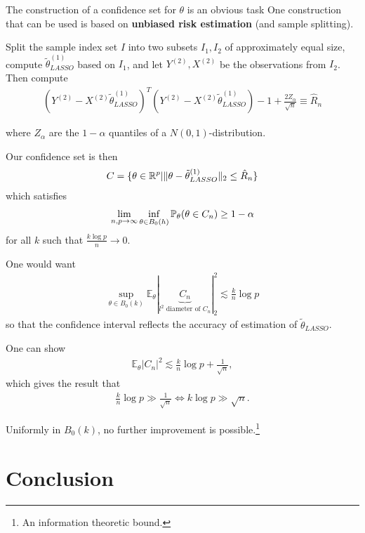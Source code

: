 The construction of a confidence set for $\theta$ is an obvious task
One construction that can be used is based on \textbf{unbiased risk
  estimation} (and sample splitting).

Split the sample index set $I$ into two subsets $I_{1}, I_{2}$ of
approximately equal size, compute $\tilde \theta^{(1)}_{LASSO}$ based
on $I_{1}$, and let $Y^{(2)}, X^{(2)}$ be the observations from
$I_{2}$. Then compute
\begin{align}
  \label{eq:186}
  (Y^{(2)} - X^{(2)} \tilde \theta^{(1)}_{LASSO})^{T} (Y^{(2)} -
  X^{(2)} \tilde \theta^{(1)}_{LASSO}) - 1 + \frac{2 Z_{\alpha}}{\sqrt{n}} \equiv \hat R_{n}
\end{align}


where $Z_{\alpha}$ are the $1-\alpha$ quantiles of a $N(0,
1)$-distribution.

Our confidence set is then
\begin{align}
  \label{eq:187}
  C = \{ \theta \in \mathbb{R}^{p} | \| \theta - \tilde \theta_{LASSO}^{(1)}
  \|_{2} \leq \hat R_{n} \}
\end{align} which satisfies
\begin{align}
  \label{eq:188}
  \lim_{n, p \rightarrow \infty} \inf_{\theta \in B_{0}(h)}
  \Prob_{\theta}(\theta \in C_{n}) \geq 1 - \alpha
\end{align} for all $k$ such that $\frac{k \log p}{n} \rightarrow 0$.

One would want
\begin{align}
  \label{eq:189}
  \sup_{\theta \in B_{0}(k)} \mathbb{E}_{\theta}
  |\underbrace{C_{n}}_{\text{$l^{2}$ diameter of $C_{n}$}}|_{2}^{2}
  \lesssim \frac{k}{n} \log p
\end{align} so that the confidence interval reflects the accuracy of
estimation of $\tilde \theta_{LASSO}$.

One can show
\begin{align}
  \label{eq:190}
  \mathbb{E}_{\theta} | C_{n} |^{2} \lesssim \frac{k}{n} \log p +
  \frac{1}{\sqrt{n}},
\end{align} which gives the result that
\begin{align}
  \label{eq:191}
  \frac{k}{n} \log p \gg \frac{1}{\sqrt{n}} \iff k \log p \gg \sqrt{n}.
\end{align}

Uniformly in $B_{0}(k)$, no further improvement is
possible.\footnote{An information theoretic bound.}

\chapter{Conclusion}
\label{cha:conclusion}

